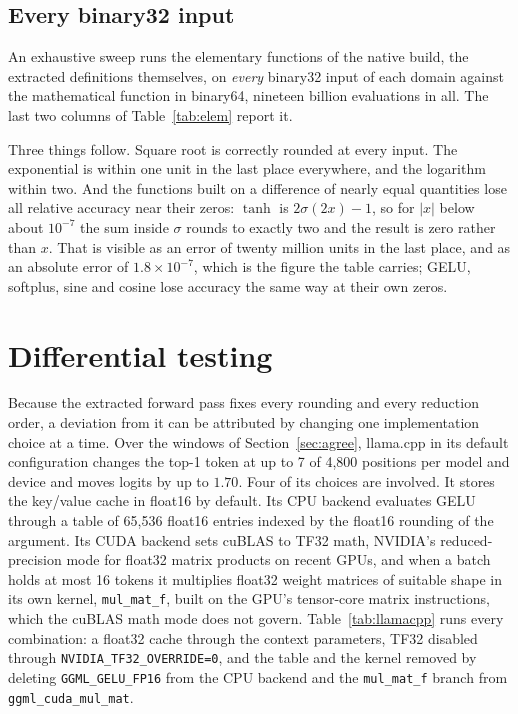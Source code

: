 \documentclass[11pt]{article}
\theoremstyle{plain}
\theoremstyle{definition}
\newcommand{\code}[1]{\texttt{#1}}
\begin{document}
\subsection{Every binary32 input}
\label{sec:exh}

An exhaustive sweep runs the elementary functions of the native build, the
extracted definitions themselves, on \emph{every} binary32 input of each domain
against the mathematical function in binary64, nineteen billion evaluations in
all. The last two columns of Table~\ref{tab:elem} report it.

Three things follow. Square root is correctly rounded at every input. The
exponential is within one unit in the last place everywhere, and the logarithm
within two. And the functions built on a difference of nearly equal quantities
lose all relative accuracy near their zeros: $\tanh$ is $2\sigma(2x) - 1$, so
for $|x|$ below about $10^{-7}$ the sum inside $\sigma$ rounds to exactly two
and the result is zero rather than $x$. That is visible as an error of twenty
million units in the last place, and as an absolute error of
$1.8\times10^{-7}$, which is the figure the table carries; GELU, softplus, sine
and cosine lose accuracy the same way at their own zeros.

\section{Differential testing}
\label{sec:diff}

Because the extracted forward pass fixes every rounding and every reduction
order, a deviation from it can be attributed by changing one implementation
choice at a time. Over the windows of Section~\ref{sec:agree}, llama.cpp in its
default configuration changes the top-1 token at up to 7 of 4{,}800 positions
per model and device and moves logits by up to $1.70$. Four of its choices are
involved. It stores the key/value cache in float16 by default. Its CPU backend
evaluates GELU through a table of 65{,}536 float16 entries indexed by
the float16 rounding of the argument. Its CUDA backend sets cuBLAS to TF32 math,
NVIDIA's reduced-precision mode for float32 matrix products on recent GPUs, and
when a batch holds at most 16 tokens it multiplies float32 weight matrices of
suitable shape in its own kernel, \code{mul\_mat\_f}, built on the GPU's
tensor-core matrix instructions, which the cuBLAS math mode does not govern.
Table~\ref{tab:llamacpp} runs every combination: a float32 cache through the
context parameters, TF32 disabled through \code{NVIDIA\_TF32\_OVERRIDE=0}, and
the table and the kernel removed by deleting \code{GGML\_GELU\_FP16} from the
CPU backend and the \code{mul\_mat\_f} branch from \code{ggml\_cuda\_mul\_mat}.
\end{document}
